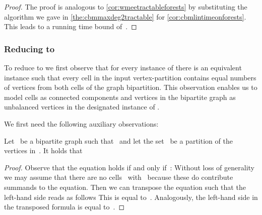\begin{proof}
  The proof is analogous to \autoref{cor:wmeetractableforests} by substituting the algorithm we gave in \autoref{the:cbmmaxdeg2tractable} for \autoref{cor:cbmlintimeonforests}. This leads to a running time bound of~.
\end{proof}

\subsubsection{Reducing \pCBMs{} to \pWMEEAs{}}
To reduce \pCBMs{} to \pWMEEAs{} we first observe that for every instance of \pCBMs{} there is an equivalent instance such that every cell in the input vertex-partition contains equal numbers of vertices from both cells of the graph bipartition. This observation enables us to model cells as connected components and vertices in the bipartite graph as unbalanced vertices in the designated instance of \pWMEEAs{}.

We first need the following auxiliary observations: 
\begin{observation}\label{obs:surplussum}
  Let~ be a bipartite graph such that~ and let the set~ be a partition of the vertices in~. It holds that 
\end{observation}
\begin{proof}
  Observe that the equation holds if and only if~: Without loss of generality we may assume that there are no cells~ with~ because these do contribute summands to the equation. Then we can transpose the equation such that the left-hand side reads as follows 
This is equal to~. Analogously, the left-hand side in the transposed formula is equal to~.
\end{proof}

